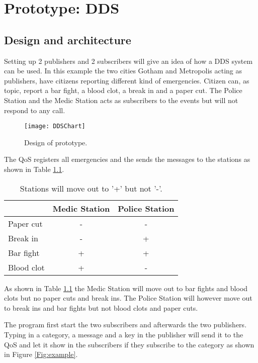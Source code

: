 \documentclass[Main]{subfiles}
\begin{document}
\chapter{Prototype: DDS}


\section{Design and architecture}
Setting up 2 publishers and 2 subscribers will give an idea of how a DDS system can be used.
In this example the two cities Gotham and Metropolis acting as publishers, have citizens reporting different kind of emergencies.
Citizen can, as topic, report a bar fight, a blood clot, a break in and a paper cut.
The Police Station and the Medic Station acts as subscribers to the events but will not respond to any call.


\begin{figure}[hbtp]
\centering
\texttt{[image: DDSChart]}
\caption{Design of prototype.}
\label{Fig:pub-sub}
\end{figure}

The QoS registers all emergencies and the sends the messages to the stations as shown in Table \ref{tab:emergencies}.

\begin{table}[htbp]
\centering

\begin{tabular}{l|c|c}
 & Medic Station & Police Station \\ 
\hline 
Paper cut & - & - \\ 
Break in & - & + \\ 
Bar fight & + & + \\ 
Blood clot & + & - \\ 
\hline 
\end{tabular} 

\caption{Stations will move out to '+' but not '-'.}
\label{tab:emergencies}
\end{table}

As shown in Table \ref{tab:emergencies} the Medic Station will move out to bar fights and blood clots but no paper cuts and break ins.
The Police Station will however move out to break ins and bar fights but not blood clots and paper cuts.

The program first start the two subscribers and afterwards the two publishers.
Typing in a category, a message and a key in the publisher will send it to the QoS and let it show in the subscribers if they subscribe to the category as shown in Figure \ref{Fig:example}.
\end{document}
